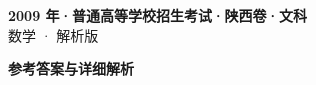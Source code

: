 \documentclass[zihao=-4, a4paper]{ctexart}
\begin{document}
\begin{center}
  {\Large\bfseries 2009 年·普通高等学校招生考试·陕西卷·文科}\\[4pt]
  {\large 数学 · 解析版}
\end{center}
\medskip
{}

\clearpage
{}
\begin{center}{\Large\bfseries 参考答案与详细解析}\end{center}
\medskip

\end{document}
